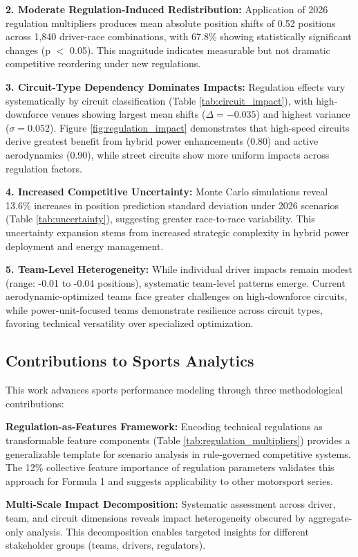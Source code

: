 \documentclass[conference]{IEEEtran}
\begin{document}
\textbf{2. Moderate Regulation-Induced Redistribution:} Application of 2026 regulation multipliers produces mean absolute position shifts of 0.52 positions across 1,840 driver-race combinations, with 67.8\% showing statistically significant changes (p $<$ 0.05). This magnitude indicates measurable but not dramatic competitive reordering under new regulations.

\textbf{3. Circuit-Type Dependency Dominates Impacts:} Regulation effects vary systematically by circuit classification (Table \ref{tab:circuit_impact}), with high-downforce venues showing largest mean shifts ($\Delta = -0.035$) and highest variance ($\sigma = 0.052$). Figure \ref{fig:regulation_impact} demonstrates that high-speed circuits derive greatest benefit from hybrid power enhancements (0.80) and active aerodynamics (0.90), while street circuits show more uniform impacts across regulation factors.

\textbf{4. Increased Competitive Uncertainty:} Monte Carlo simulations reveal 13.6\% increases in position prediction standard deviation under 2026 scenarios (Table \ref{tab:uncertainty}), suggesting greater race-to-race variability. This uncertainty expansion stems from increased strategic complexity in hybrid power deployment and energy management.

\textbf{5. Team-Level Heterogeneity:} While individual driver impacts remain modest (range: -0.01 to -0.04 positions), systematic team-level patterns emerge. Current aerodynamic-optimized teams face greater challenges on high-downforce circuits, while power-unit-focused teams demonstrate resilience across circuit types, favoring technical versatility over specialized optimization.

\subsection{Contributions to Sports Analytics}

This work advances sports performance modeling through three methodological contributions:

\textbf{Regulation-as-Features Framework:} Encoding technical regulations as transformable feature components (Table \ref{tab:regulation_multipliers}) provides a generalizable template for scenario analysis in rule-governed competitive systems. The 12\% collective feature importance of regulation parameters validates this approach for Formula 1 and suggests applicability to other motorsport series.

\textbf{Multi-Scale Impact Decomposition:} Systematic assessment across driver, team, and circuit dimensions reveals impact heterogeneity obscured by aggregate-only analysis. This decomposition enables targeted insights for different stakeholder groups (teams, drivers, regulators).
\end{document}
